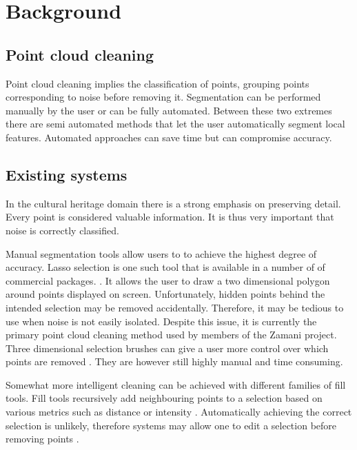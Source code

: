 \documentclass[10pt,twocolumn]{article}
\begin{document}

\section{Background}

\subsection{Point cloud cleaning}
Point cloud cleaning implies the classification of points, grouping points corresponding to noise before removing it. Segmentation can be performed manually by the user or can be fully automated. Between these two extremes there are semi automated methods that let the user automatically segment local features. Automated approaches can save time but can compromise accuracy.

\subsection{Existing systems}
In the cultural heritage domain there is a strong emphasis on preserving detail. Every point is considered valuable information. It is thus very important that noise is correctly classified.

Manual segmentation tools allow users to to achieve the highest degree of accuracy. Lasso selection is one such tool that is available in a number of of commercial packages. \cite{Pointools2012,Leica2012,Technodigit2012}. It allows the user to draw a two dimensional polygon around points displayed on screen. Unfortunately, hidden points behind the intended selection may be removed accidentally. Therefore, it may be tedious to use when noise is not easily isolated. Despite this issue, it is currently the primary point cloud cleaning method used by members of the Zamani project. Three dimensional selection brushes can give a user more control over which points are removed \cite{Pointools2012}. They are however still highly manual and time consuming.


Somewhat more intelligent cleaning can be achieved with different families of fill tools. Fill tools recursively add neighbouring points to a selection based on various metrics such as distance or intensity \cite{Pointools2012}. Automatically achieving the correct selection is unlikely, therefore systems may allow one to edit a selection before removing points \cite{Pointools2012}.
\end{document}
